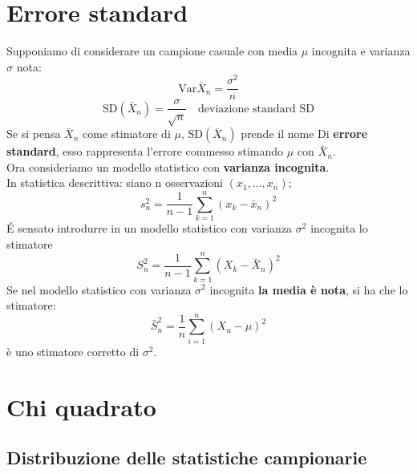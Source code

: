 \documentclass[12pt, a4paper, openany]{book}
\begin{document}
\section{Errore standard}
Supponiamo di considerare un campione casuale con media $\mu$ incognita
e varianza $\sigma$ nota:
\begin{equation*}
    \text{Var}\bar{X}_n= \frac{\sigma^2}{n}
\end{equation*}
\begin{equation*}
    \text{SD}(\bar{X}_n) = \frac{\sigma}{\sqrt{n}} \quad \text{deviazione standard SD}
\end{equation*}
Se si pensa $\bar{X}_n$ come stimatore di $\mu$, SD$(\bar{X}_n)$ prende il nome Di
\textbf{errore standard}, esso rappresenta l'errore commesso stimando $\mu$ con $\bar{X}_n$.
\\ Ora consideriamo un modello statistico con \textbf{varianza incognita}.
\\ In statistica descrittiva: siano n osservazioni $(x_1, ..., x_n)$;
\begin{equation*}
    s^{2}_n=\frac{1}{n-1}\sum_{k=1}^n(x_k-\bar{x}_n)^2
\end{equation*}
\'E sensato introdurre in un modello statistico con varianza $\sigma^2$ incognita lo
stimatore
\begin{equation*}
    S^{2}_n=\frac{1}{n-1}\sum_{k=1}^n(X_k-\bar{X}_n)^2
\end{equation*}
Se nel modello statistico con varianza $\sigma^2$ incognita \textbf{la media è nota}, si ha che
lo stimatore:
\begin{equation*}
    \bar{S}^{2}_n = \frac{1}{n}\sum_{i=1}^n(X_u - \mu)^2
\end{equation*}
è uno stimatore corretto di $\sigma^2$.
\section{Chi quadrato}
\subsection*{Distribuzione delle statistiche campionarie}
\end{document}
